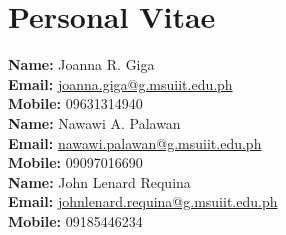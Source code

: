 \chapter{Personal Vitae}

\noindent\textbf{Name:} Joanna R. Giga \\
\textbf{Email:} \href{mailto:joanna.giga@g.msuiit.edu.ph}{joanna.giga@g.msuiit.edu.ph} \\
\textbf{Mobile:} 09631314940 \\[1em]


\noindent\textbf{Name:} Nawawi A. Palawan \\
\textbf{Email:} \href{mailto:nawawi.palawan@g.msuiit.edu.ph}{nawawi.palawan@g.msuiit.edu.ph} \\
\textbf{Mobile:} 09097016690 \\[1em]


\noindent\textbf{Name:} John Lenard Requina \\
\textbf{Email:} \href{mailto:johnlenard.requina@g.msuiit.edu.ph}{johnlenard.requina@g.msuiit.edu.ph} \\
\textbf{Mobile:} 09185446234 \\[1em]
